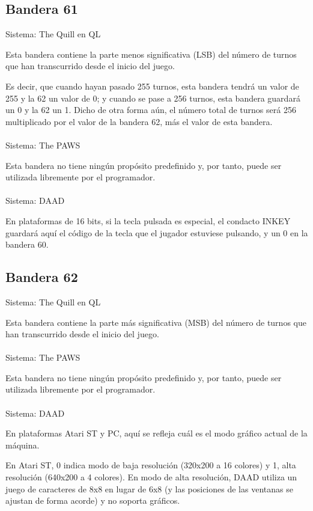 \documentclass[11pt, a5paper]{article}
\newcommand{\quill}{\textsf{The Quill}\xspace}
\newcommand{\paw}{\textsf{The PAWS}\xspace}
\newcommand{\daad}{\textsf{DAAD}\xspace}
\newcommand{\sistema}[1]{\noindent Sistema: #1 \nopagebreak}
\begin{document}
\subsection{Bandera 61}\label{flag61}

\sistema{\quill en QL}

Esta bandera contiene la parte menos significativa (LSB) del número de turnos que han transcurrido desde el inicio del juego.

Es decir, que cuando hayan pasado 255 turnos, esta bandera tendrá un valor de 255 y la 62 un valor de 0; y cuando se pase a 256 turnos, esta bandera guardará un 0 y la 62 un 1. Dicho de otra forma aún, el número total de turnos será 256 multiplicado por el valor de la bandera 62, más el valor de esta bandera.
\\\ \\
\sistema{\paw}

Esta bandera no tiene ningún propósito predefinido y, por tanto, puede ser utilizada libremente por el programador.
\\\ \\
\sistema{\daad}

En plataformas de 16 bits, si la tecla pulsada es especial, el condacto INKEY guardará aquí el código de la tecla que el jugador estuviese pulsando, y un 0 en la bandera 60. \cite[págs. 25, 61 y 62]{DAAD}

\subsection{Bandera 62}

\sistema{\quill en QL}

Esta bandera contiene la parte más significativa (MSB) del número de turnos que han transcurrido desde el inicio del juego.
\\\ \\
\sistema{\paw}

Esta bandera no tiene ningún propósito predefinido y, por tanto, puede ser utilizada libremente por el programador.
\\\ \\
\sistema{\daad}

En plataformas Atari ST y PC, aquí se refleja cuál es el modo gráfico actual de la máquina. \cite[pág. 62]{DAAD}

En Atari ST, 0 indica modo de baja resolución (320x200 a 16 colores) y 1, alta resolución (640x200 a 4 colores). En modo de alta resolución, \daad utiliza un juego de caracteres de 8x8 en lugar de 6x8 (y las posiciones de las ventanas se ajustan de forma acorde) y no soporta gráficos.
\end{document}
